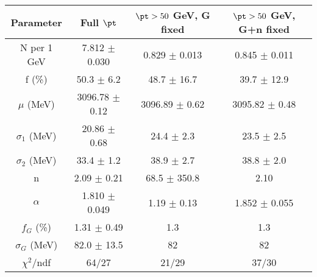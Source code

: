 \begin{tabular}{c||c|c|c}
Parameter & Full $\pt$ & $\pt>50$ GeV, G fixed & $\pt>50$ GeV, G+n fixed \\
\hline
N per 1 GeV & 7.812 $\pm$ 0.030 & 0.829 $\pm$ 0.013 & 0.845 $\pm$ 0.011\\
f (\%) & 50.3 $\pm$ 6.2 & 48.7 $\pm$ 16.7 & 39.7 $\pm$ 12.9\\
$\mu$ (MeV) & 3096.78 $\pm$ 0.12 & 3096.89 $\pm$ 0.62 & 3095.82 $\pm$ 0.48\\
$\sigma_1$ (MeV) & 20.86 $\pm$ 0.68 & 24.4 $\pm$ 2.3 & 23.5 $\pm$ 2.5\\
$\sigma_2$ (MeV) & 33.4 $\pm$ 1.2 & 38.9 $\pm$ 2.7 & 38.8 $\pm$ 2.0\\
n & 2.09 $\pm$ 0.21 & 68.5 $\pm$ 350.8 & 2.10\\
$\alpha$ & 1.810 $\pm$ 0.049 & 1.19 $\pm$ 0.13 & 1.852 $\pm$ 0.055\\
$f_G$ (\%) & 1.31 $\pm$ 0.49 & 1.3 & 1.3\\
$\sigma_G$ (MeV) & 82.0 $\pm$ 13.5 & 82 & 82\\
\hline
$\chi^2$/ndf & 64/27 & 21/29 & 37/30\\
\end{tabular}
